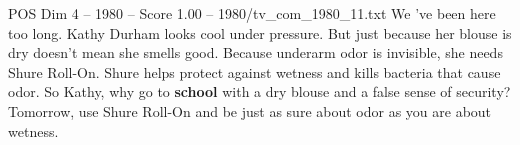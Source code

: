 \begin{textsample}{POS Dim 4 – 1980 – Score 1.00 – 1980/tv\_com\_1980\_11.txt}  \label{ex:f4_pos_064}
We 've been here too long.
Kathy Durham looks cool under pressure.
But just because her blouse is dry doesn't mean she smells good.
Because underarm odor is invisible, she needs Shure Roll-On.
Shure helps protect against wetness and kills bacteria that cause odor.
So Kathy, why go to \textbf{school} with a dry blouse and a false sense of security?
Tomorrow, use Shure Roll-On and be just as sure about odor as you are about wetness.

\end{textsample}
